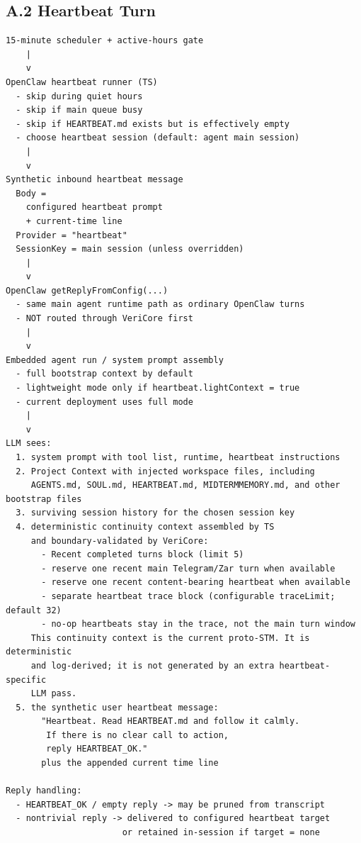 \documentclass[11pt]{article}
\begin{document}
\subsection{A.2 Heartbeat Turn}
\begin{lstlisting}[style=code]
15-minute scheduler + active-hours gate
    |
    v
OpenClaw heartbeat runner (TS)
  - skip during quiet hours
  - skip if main queue busy
  - skip if HEARTBEAT.md exists but is effectively empty
  - choose heartbeat session (default: agent main session)
    |
    v
Synthetic inbound heartbeat message
  Body =
    configured heartbeat prompt
    + current-time line
  Provider = "heartbeat"
  SessionKey = main session (unless overridden)
    |
    v
OpenClaw getReplyFromConfig(...)
  - same main agent runtime path as ordinary OpenClaw turns
  - NOT routed through VeriCore first
    |
    v
Embedded agent run / system prompt assembly
  - full bootstrap context by default
  - lightweight mode only if heartbeat.lightContext = true
  - current deployment uses full mode
    |
    v
LLM sees:
  1. system prompt with tool list, runtime, heartbeat instructions
  2. Project Context with injected workspace files, including
     AGENTS.md, SOUL.md, HEARTBEAT.md, MIDTERMMEMORY.md, and other bootstrap files
  3. surviving session history for the chosen session key
  4. deterministic continuity context assembled by TS
     and boundary-validated by VeriCore:
       - Recent completed turns block (limit 5)
       - reserve one recent main Telegram/Zar turn when available
       - reserve one recent content-bearing heartbeat when available
       - separate heartbeat trace block (configurable traceLimit; default 32)
       - no-op heartbeats stay in the trace, not the main turn window
     This continuity context is the current proto-STM. It is deterministic
     and log-derived; it is not generated by an extra heartbeat-specific
     LLM pass.
  5. the synthetic user heartbeat message:
       "Heartbeat. Read HEARTBEAT.md and follow it calmly.
        If there is no clear call to action,
        reply HEARTBEAT_OK."
       plus the appended current time line

Reply handling:
  - HEARTBEAT_OK / empty reply -> may be pruned from transcript
  - nontrivial reply -> delivered to configured heartbeat target
                       or retained in-session if target = none
\end{lstlisting}
\end{document}
